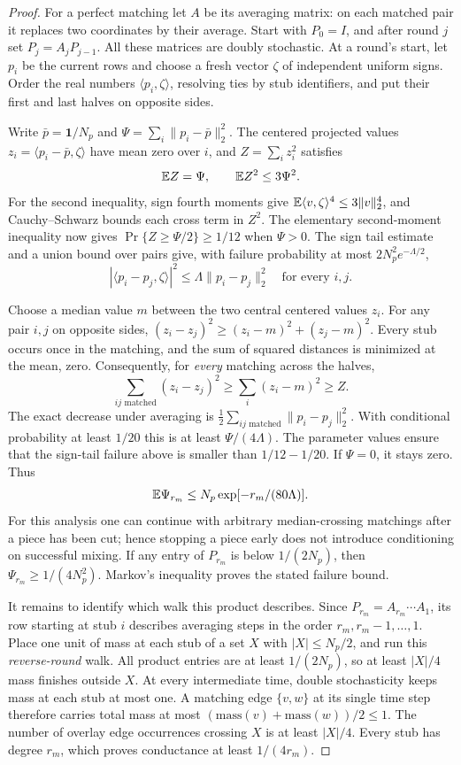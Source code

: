 \begin{proof}
For a perfect matching let $A$ be its averaging matrix: on each
matched pair it replaces two coordinates by their average.  Start
with $P_0=I$, and after round $j$ set
$P_j=A_jP_{j-1}$.  All these matrices are doubly stochastic.  At a
round's start, let $p_i$ be the current rows and choose a fresh vector
$\zeta$ of independent uniform signs.  Order the real numbers
$\langle p_i,\zeta\rangle$, resolving ties by stub identifiers, and
put their first and last halves on opposite sides.

Write $\bar p=\mathbf1/N_p$ and
$\Psi=\sum_i\|p_i-\bar p\|_2^2$.  The centered projected values
$z_i=\langle p_i-\bar p,\zeta\rangle$ have mean zero over $i$, and
$Z=\sum_i z_i^2$ satisfies
\[
 \mathbb E Z=\Psi,\qquad \mathbb E Z^2\le3\Psi^2.
\]
For the second inequality, sign fourth moments give
$\mathbb E\langle v,\zeta\rangle^4\le3\|v\|_2^4$, and
Cauchy--Schwarz bounds each cross term in $Z^2$.
The elementary second-moment inequality now gives
$\Pr\{Z\ge\Psi/2\}\ge1/12$ when $\Psi>0$.
The sign tail estimate and a union bound over pairs give, with
failure probability at most $2N_p^2e^{-\Lambda/2}$,
\[
 |\langle p_i-p_j,\zeta\rangle|^2
       \le\Lambda\|p_i-p_j\|_2^2\quad\text{for every $i,j$}.
\]

Choose a median value $m$ between the two central centered values $z_i$.
For any pair $i,j$ on opposite sides,
$(z_i-z_j)^2\ge(z_i-m)^2+(z_j-m)^2$.  Every stub occurs once in
the matching, and the sum of squared distances is minimized at the
mean, zero.  Consequently, for \emph{every} matching across the
halves,
\[
 \sum_{ij\text{ matched}}(z_i-z_j)^2
       \ge\sum_i(z_i-m)^2\ge Z.
\]
The exact decrease under averaging is
$\frac12\sum_{ij\text{ matched}}\|p_i-p_j\|_2^2$.
With conditional probability at least $1/20$ this is at least
$\Psi/(4\Lambda)$.  The parameter values ensure that the sign-tail
failure above is smaller than $1/12-1/20$.  If $\Psi=0$, it stays
zero.  Thus
\[
 \mathbb E\Psi_{r_m}\le N_p\exp[-r_m/(80\Lambda)].
\]
For this analysis one can continue with arbitrary median-crossing
matchings after a piece has been cut; hence stopping a piece early
does not introduce conditioning on successful mixing.  If any entry
of $P_{r_m}$ is below $1/(2N_p)$, then
$\Psi_{r_m}\ge1/(4N_p^2)$.  Markov's inequality proves the stated
failure bound.

It remains to identify which walk this product describes.  Since
$P_{r_m}=A_{r_m}\cdots A_1$, its row starting at stub $i$ describes
averaging steps in the order $r_m,r_m-1,\ldots,1$.  Place one unit
of mass at each stub of a set $X$ with $|X|\le N_p/2$, and run this
\emph{reverse-round} walk.  All product entries are at least
$1/(2N_p)$, so at least $|X|/4$ mass finishes outside $X$.
At every intermediate time, double stochasticity keeps mass at each
stub at most one.  A matching edge $\{v,w\}$ at its single time step
therefore carries total mass at most
$(\mathrm{mass}(v)+\mathrm{mass}(w))/2\le1$.  The number of overlay
edge occurrences crossing $X$ is at least $|X|/4$.  Every stub has
degree $r_m$, which proves conductance at least $1/(4r_m)$.


\end{proof}
